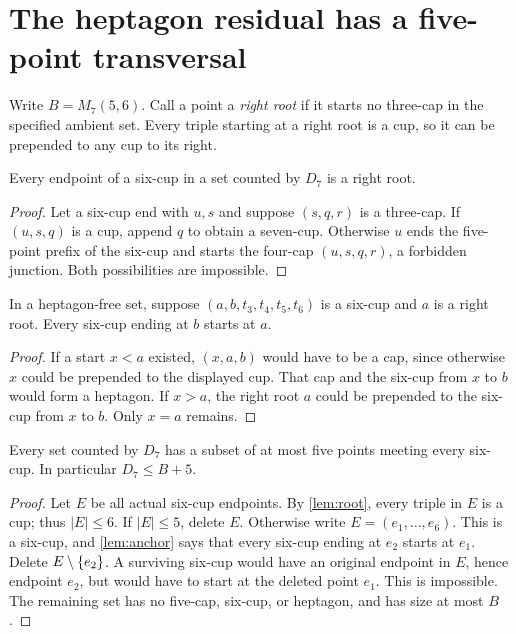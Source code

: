 \section{The heptagon residual has a five-point transversal}\label{sec:deletion}
Write $B=M_7(5,6)$. Call a point a \emph{right root} if it starts no
three-cap in the specified ambient set. Every triple starting at a
right root is a cup, so it can be prepended to any cup to its right.

\begin{lemma}\label{lem:root}
Every endpoint of a six-cup in a set counted by $D_7$ is a right root.
\end{lemma}
\begin{proof}
Let a six-cup end with $u,s$ and suppose $(s,q,r)$ is a three-cap.
If $(u,s,q)$ is a cup, append $q$ to obtain a seven-cup. Otherwise
$u$ ends the five-point prefix of the six-cup and starts the four-cap
$(u,s,q,r)$, a forbidden junction. Both possibilities are impossible.
\end{proof}

\begin{lemma}[Anchoring]\label{lem:anchor}
In a heptagon-free set, suppose $(a,b,t_3,t_4,t_5,t_6)$ is a six-cup
and $a$ is a right root. Every six-cup ending at $b$ starts at $a$.
\end{lemma}
\begin{proof}
If a start $x<a$ existed, $(x,a,b)$ would have to be a cap, since
otherwise $x$ could be prepended to the displayed cup. That cap and
the six-cup from $x$ to $b$ would form a heptagon. If $x>a$, the
right root $a$ could be prepended to the six-cup from $x$ to $b$.
Only $x=a$ remains.
\end{proof}

\begin{theorem}\label{thm:deletion}
Every set counted by $D_7$ has a subset of at most five points meeting
every six-cup. In particular $D_7\le B+5$.
\end{theorem}
\begin{proof}
Let $E$ be all actual six-cup endpoints. By \cref{lem:root}, every
triple in $E$ is a cup; thus $|E|\le6$. If $|E|\le5$, delete $E$.
Otherwise write $E=(e_1,\ldots,e_6)$. This is a six-cup, and
\cref{lem:anchor} says that every six-cup ending at $e_2$ starts at
$e_1$. Delete $E\setminus\{e_2\}$. A surviving six-cup would have
an original endpoint in $E$, hence endpoint $e_2$, but would have to
start at the deleted point $e_1$. This is impossible.
The remaining set has no five-cap, six-cup, or heptagon, and has size
at most $B$.
\end{proof}

